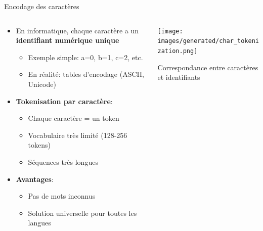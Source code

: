 \documentclass[aspectratio=169,11pt]{beamer}
\begin{document}
\begin{frame}{Encodage des caractères}
    \begin{columns}
        \begin{column}{0.55\textwidth}
            \begin{itemize}
                \item En informatique, chaque caractère a un \textbf{identifiant numérique unique}
                \begin{itemize}
                    \item Exemple simple: a=0, b=1, c=2, etc.
                    \item En réalité: tables d'encodage (ASCII, Unicode)
                \end{itemize}
                \vspace{0.1cm}
                \item \textbf{Tokenisation par caractère}:
                \begin{itemize}
                    \item Chaque caractère = un token
                    \item Vocabulaire très limité (128-256 tokens)
                    \item Séquences très longues
                \end{itemize}
                \vspace{0.1cm}
                \item \textbf{Avantages}:
                \begin{itemize}
                    \item Pas de mots inconnus
                    \item Solution universelle pour toutes les langues
                \end{itemize}
            \end{itemize}
        \end{column}
        \begin{column}{0.45\textwidth}
            \texttt{[image: images/generated/char\_tokenization.png]}
            \vspace{0.1cm}
            \begin{center}
                \small{Correspondance entre caractères et identifiants}
            \end{center}
        \end{column}
    \end{columns}
\end{frame}
\end{document}
